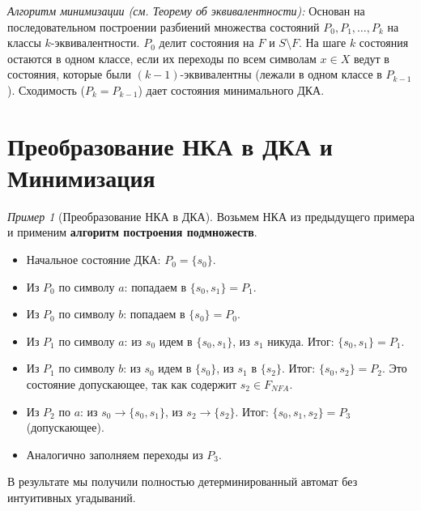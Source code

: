 \documentclass[12pt,a4paper]{article}
\theoremstyle{definition}
\theoremstyle{plain}
\theoremstyle{remark}
\newtheorem{example}{Пример}
\begin{document}
\textit{Алгоритм минимизации (см. Теорему об эквивалентности):}
Основан на последовательном построении разбиений множества состояний $P_0, P_1, \dots, P_k$ на классы $k$-эквивалентности. $P_0$ делит состояния на $F$ и $S \setminus F$. На шаге $k$ состояния остаются в одном классе, если их переходы по всем символам $x \in X$ ведут в состояния, которые были $(k-1)$-эквивалентны (лежали в одном классе в $P_{k-1}$). Сходимость ($P_k = P_{k-1}$) дает состояния минимального ДКА.

\section{Преобразование НКА в ДКА и Минимизация}

\begin{example}[Преобразование НКА в ДКА]
Возьмем НКА из предыдущего примера и применим \textbf{алгоритм построения подмножеств}.
\begin{itemize}
    \item Начальное состояние ДКА: $P_0 = \{s_0\}$.
    \item Из $P_0$ по символу $a$: попадаем в $\{s_0, s_1\} = P_1$.
    \item Из $P_0$ по символу $b$: попадаем в $\{s_0\} = P_0$.
    \item Из $P_1$ по символу $a$: из $s_0$ идем в $\{s_0, s_1\}$, из $s_1$ никуда. Итог: $\{s_0, s_1\} = P_1$.
    \item Из $P_1$ по символу $b$: из $s_0$ идем в $\{s_0\}$, из $s_1$ в $\{s_2\}$. Итог: $\{s_0, s_2\} = P_2$. Это состояние допускающее, так как содержит $s_2 \in F_{NFA}$.
    \item Из $P_2$ по $a$: из $s_0 \to \{s_0, s_1\}$, из $s_2 \to \{s_2\}$. Итог: $\{s_0, s_1, s_2\} = P_3$ (допускающее).
    \item Аналогично заполняем переходы из $P_3$.
\end{itemize}
В результате мы получили полностью детерминированный автомат без интуитивных угадываний.

\begin{center}
\end{center}
\end{example}
\end{document}
